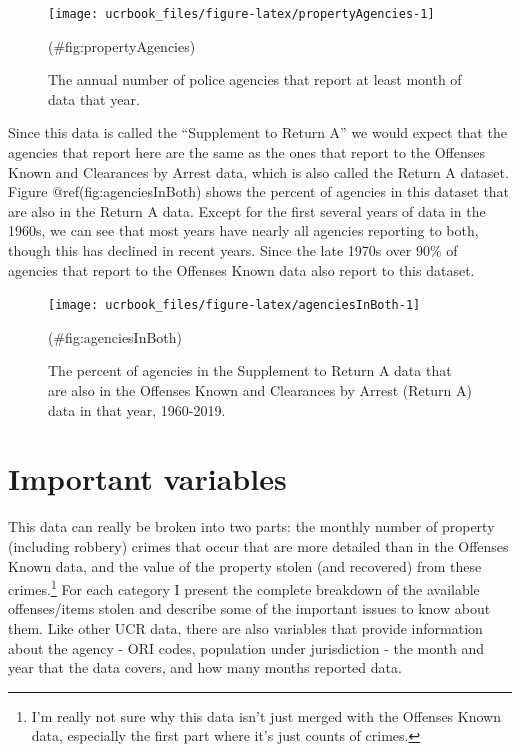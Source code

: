 \documentclass[
  12pt,
  openany]{book}
\begin{document}
\begin{figure}

{\centering \texttt{[image: ucrbook\_files/figure-latex/propertyAgencies-1]} 

}

\caption{The annual number of police agencies that report at least month of data that year.}(\#fig:propertyAgencies)
\end{figure}

Since this data is called the ``Supplement to Return A'' we would expect that the agencies that report here are the same as the ones that report to the Offenses Known and Clearances by Arrest data, which is also called the Return A dataset. Figure @ref(fig:agenciesInBoth) shows the percent of agencies in this dataset that are also in the Return A data. Except for the first several years of data in the 1960s, we can see that most years have nearly all agencies reporting to both, though this has declined in recent years. Since the late 1970s over 90\% of agencies that report to the Offenses Known data also report to this dataset.

\begin{figure}

{\centering \texttt{[image: ucrbook\_files/figure-latex/agenciesInBoth-1]} 

}

\caption{The percent of agencies in the Supplement to Return A data that are also in the Offenses Known and Clearances by Arrest (Return A) data in that year, 1960-2019.}(\#fig:agenciesInBoth)
\end{figure}

\hypertarget{important-variables-1}{%
\section{Important variables}\label{important-variables-1}}

This data can really be broken into two parts: the monthly number of property (including robbery) crimes that occur that are more detailed than in the Offenses Known data, and the value of the property stolen (and recovered) from these crimes.\footnote{I'm really not sure why this data isn't just merged with the Offenses Known data, especially the first part where it's just counts of crimes.} For each category I present the complete breakdown of the available offenses/items stolen and describe some of the important issues to know about them. Like other UCR data, there are also variables that provide information about the agency - ORI codes, population under jurisdiction - the month and year that the data covers, and how many months reported data.
\end{document}
